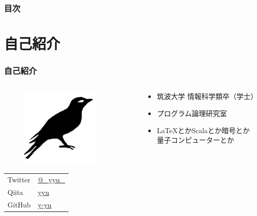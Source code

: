 \frame{\maketitle}

\begin{frame}
  \frametitle{目次}

  \tableofcontents
\end{frame}

\section{自己紹介}
\begin{frame}
  \frametitle{自己紹介}
  
  \begin{columns}
    \begin{column}{0.4\textwidth}
      \begin{center}
        \begin{figure}
          \includegraphics[width=0.8\textwidth]{img/bird.png}
        \end{figure}
      \end{center}
 
      \begin{table}[h]
        \begin{tabular}{ll}
          Twitter & \href{https://twitter.com/\_yyu\_}{@\_yyu\_} \\
          Qiita &  \href{https://qiita.com/yyu}{yyu} \\
          GitHub &  \href{https://github.com/y-yu}{y-yu} \\
        \end{tabular}
      \end{table}
    \end{column}
    \begin{column}{0.6\textwidth}
      \pause
      \begin{itemize}
        \item 筑波大学 情報科学類卒（学士）
        \item プログラム論理研究室
        \item<+-> \LaTeX とかScalaとか暗号とか量子コンピューターとか


\end{itemize}
\end{column}
\end{columns}
\end{frame}
